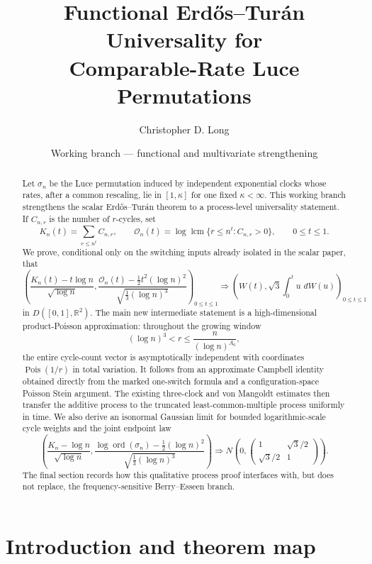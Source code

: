 \documentclass[11pt]{article}
\title{Functional Erd\H{o}s--Tur\'an Universality for\\
Comparable-Rate Luce Permutations}
\author{Christopher D. Long}
\date{Working branch --- functional and multivariate strengthening}
\theoremstyle{definition}
\theoremstyle{remark}
\newcommand{\dd}{\,d}
\newcommand{\Pois}{\operatorname{Pois}}
\newcommand{\ord}{\operatorname{ord}}
\newcommand{\lcm}{\operatorname{lcm}}
\newcommand{\cO}{\mathcal O}
\newcommand{\R}{\mathbb R}
\begin{document}
\maketitle

\begin{abstract}
Let $\sigma_n$ be the Luce permutation induced by independent exponential
clocks whose rates, after a common rescaling, lie in $[1,\kappa]$ for one
fixed $\kappa<\infty$.  This working branch strengthens the scalar
Erd\H{o}s--Tur\'an theorem to a process-level universality statement.  If
$C_{n,r}$ is the number of $r$-cycles, set
\[
 K_n(t)=\sum_{r\le n^t}C_{n,r},
 \qquad
 \cO_n(t)=\log\lcm\{r\le n^t:C_{n,r}>0\},
 \qquad 0\le t\le1.
\]
We prove, conditional only on the switching inputs already isolated in the
scalar paper, that
\[
 \left(
 \frac{K_n(t)-t\log n}{\sqrt{\log n}},
 \frac{\cO_n(t)-\frac12t^2(\log n)^2}
      {\sqrt{\frac13(\log n)^3}}
 \right)_{0\le t\le1}
 \Rightarrow
 \left(
 W(t),\sqrt3\int_0^t u\,\dd W(u)
 \right)_{0\le t\le1}
\]
in $D([0,1],\R^2)$.  The main new intermediate statement is a
high-dimensional product-Poisson approximation: throughout the growing
window
\[
 (\log n)^3<r\le \frac{n}{(\log n)^{A_0}},
\]
the entire cycle-count vector is asymptotically independent with coordinates
$\Pois(1/r)$ in total variation.  It follows from an approximate Campbell
identity obtained directly from the marked one-switch formula and a
configuration-space Poisson Stein argument.  The existing three-clock and
von Mangoldt estimates then transfer the additive process to the truncated
least-common-multiple process uniformly in time.  We also derive an
isonormal Gaussian limit for bounded logarithmic-scale cycle weights and the
joint endpoint law
\[
 \left(
 \frac{K_n-\log n}{\sqrt{\log n}},
 \frac{\log\ord(\sigma_n)-\frac12(\log n)^2}
      {\sqrt{\frac13(\log n)^3}}
 \right)
 \Rightarrow
 N\!\left(0,
 \begin{pmatrix}1&\sqrt3/2\\ \sqrt3/2&1\end{pmatrix}\right).
\]
The final section records how this qualitative process proof interfaces with,
but does not replace, the frequency-sensitive Berry--Esseen branch.
\end{abstract}

\tableofcontents

\section{Introduction and theorem map}
\end{document}
